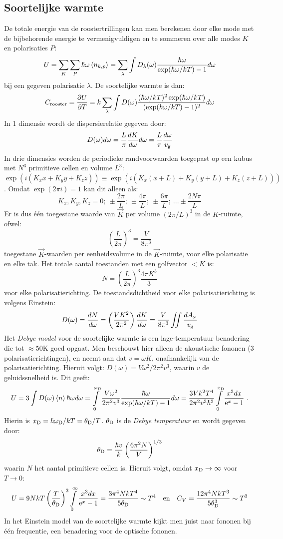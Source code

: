 \documentclass[twoside]{report}
\begin{document}
\subsection{Soortelijke warmte}
De totale energie van de roostertrillingen kan men berekenen door elke mode
met de bijbehorende energie te vermenigvuldigen en te sommeren over alle
modes $K$ en polarisaties $P$:
\[
U=\sum\limits_{K}\sum\limits_{P}\hbar\omega\left\langle n_{k,p} \right\rangle=
\sum\limits_{\lambda}\int D_{\lambda}(\omega)\frac{\hbar\omega}{\exp(\hbar\omega/kT)-1}d\omega
\]
bij een gegeven polarisatie $\lambda$. De soortelijke warmte is dan:
\[
C_{\rm rooster}=\frac{\partial U}{\partial T}=k\sum\limits_{\lambda}\int D(\omega)
\frac{(\hbar\omega/kT)^2\exp(\hbar\omega/kT)}{(\exp(\hbar\omega/kT)-1)^2} d\omega
\]
In 1 dimensie wordt de dispersierelatie gegeven door:
\[
D(\omega)d\omega =\frac{L}{\pi}\frac{dK}{d\omega}d\omega=\frac{L}{\pi}\frac{d\omega}{v_{\rm g}}
\]
In drie dimensies worden de periodieke randvoorwaarden toegepast op een kubus
met $N^3$ primitieve cellen en volume $L^3$:
$\exp(i(K_x x+K_y y +K_z z))\equiv\exp(i(K_x(x+L)+K_y(y+L)+K_z(z+L)))$.
\npar
Omdat $\exp(2\pi i)=1$ kan dit alleen als:
\[
K_x,K_y,K_z = 0;~\pm\frac{2\pi}{L};~\pm\frac{4\pi}{L};~\pm\frac{6\pi}{L};~...\pm\frac{2N\pi}{L}
\]
Er is dus \'e\'en toegestane waarde van $\vec{K}$ per volume $(2\pi/L)^3$
in de $K$-ruimte, ofwel:
\[
\left(\frac{L}{2\pi}\right)^3 =\frac{V}{8\pi^3}
\]
toegestane $\vec{K}$-waarden per eenheidsvolume in de $\vec{K}$-ruimte, voor
elke polarisatie en elke tak. Het totale aantal toestanden met een golfvector
$<K$ is:
\[
N=\left(\frac{L}{2\pi}\right)^3\frac{4\pi K^3}{3}
\]
voor elke polarisatierichting. De toestandsdichtheid voor elke
polarisatierichting is volgens Einstein:
\[
D(\omega)=\frac{dN}{d\omega}=\left(\frac{VK^2}{2\pi^2}\right)
\frac{dK}{d\omega}=\frac{V}{8\pi^3}\int\hspace*{-2mm}\int\frac{dA_{\omega}}{v_{\rm g}}
\]
Het {\it Debye model} voor de soortelijke warmte is een lage-temperatuur
benadering die tot $\approx50$K goed opgaat. Men beschouwt hier alleen
de akoustische fononen (3 polarisatierichtingen), en neemt aan dat
$v=\omega K$, onafhankelijk van de polarisatierichting. Hieruit volgt:
$D(\omega)=V\omega^2/2\pi^2v^3$, waarin $v$ de geluidssnelheid is. Dit geeft:
\[
U=3\int D(\omega)\left\langle n \right\rangle\hbar\omega d\omega=
\int\limits_0^{\omega_D}\frac{V\omega^2}{2\pi^2v^3}\frac{\hbar\omega}{\exp(\hbar\omega/kT)-1}d\omega=
\frac{3Vk^2T^4}{2\pi^2v^3\hbar^3}\int\limits_0^{x_{\rm D}}\frac{x^3dx}{{\rm e}^x-1}~.
\]
Hierin is $x_{\rm D}=\hbar\omega_{\rm D}/kT=\theta_{\rm D}/T$.
$\theta_{\rm D}$ is de {\it Debye temperatuur} en wordt gegeven door:
\[
\theta_{\rm D}=\frac{\hbar v}{k}\left(\frac{6\pi^2N}{V}\right)^{1/3}
\]
waarin $N$ het aantal primitieve cellen is. Hieruit volgt, omdat
$x_{\rm D}\rightarrow\infty$ voor $T\rightarrow0$:
\[
U=9NkT\left(\frac{T}{\theta_{\rm D}}\right)^3\int\limits_0^{\infty}\frac{x^3dx}{{\rm e}^x-1}=
\frac{3\pi^4NkT^4}{5\theta_{\rm D}}\sim T^4~~~\mbox{en}~~~
C_V=\frac{12\pi^4NkT^3}{5\theta_{\rm D}^3}\sim T^3
\]
In het Einstein model van de soortelijke warmte kijkt men juist naar fononen
bij \'e\'en frequentie, een benadering voor de optische fononen.
\end{document}
